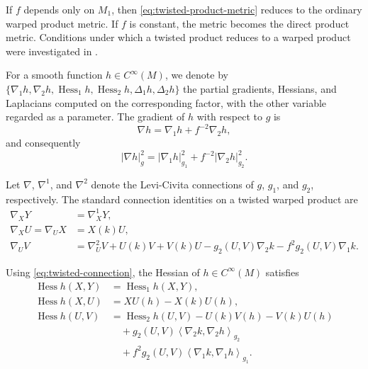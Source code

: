 \documentclass[a4paper,11pt]{article}
\theoremstyle{plain}
\numberwithin{equation}{section}
\begin{document}
If \(f\) depends only on \(M_{1}\), then
\eqref{eq:twisted-product-metric} reduces to the ordinary warped
product metric. If \(f\) is constant, the metric becomes the direct
product metric. Conditions under which a twisted product reduces
to a warped product were investigated in
\cite{FernandezLopezEtAl2001}.

For a smooth function \(h\in C^{\infty}(M)\), we denote by
$\{\nabla_{1}h,\nabla_{2}h,\operatorname{Hess}_{1}h, \operatorname{Hess}_{2}h, \Delta_{1}h,\Delta_{2}h\}$
the partial gradients, Hessians, and Laplacians computed on the
corresponding factor, with the other variable regarded as a
parameter. The gradient of \(h\) with respect to \(g\) is
\begin{equation}
	\nabla h
	=
	\nabla_{1}h
	+
	f^{-2}\nabla_{2}h,
	\label{eq:twisted-gradient}
\end{equation}
and consequently
\begin{equation}
	\lvert\nabla h\rvert_{g}^{2}
	=
	\lvert\nabla_{1}h\rvert_{g_{1}}^{2}
	+
	f^{-2}\lvert\nabla_{2}h\rvert_{g_{2}}^{2}.
	\label{eq:twisted-gradient-norm}
\end{equation}

Let \(\nabla\), \(\nabla^{1}\), and \(\nabla^{2}\) denote the
Levi-Civita connections of \(g\), \(g_{1}\), and \(g_{2}\),
respectively. The standard connection identities on a twisted
warped product are
\begin{subequations}
	\label{eq:twisted-connection}
	\begin{align}
		\nabla_{X}Y
		&=
		\nabla^{1}_{X}Y,
		\label{eq:twisted-connection-horizontal}
		\\
		\nabla_{X}U
		=
		\nabla_{U}X
		&=
		X(k)U,
		\label{eq:twisted-connection-mixed}
		\\
		\nabla_{U}V
		&=
		\nabla^{2}_{U}V
		+
		U(k)V
		+
		V(k)U
		-
		g_{2}(U,V)\nabla_{2}k
		-
		f^{2}g_{2}(U,V)\nabla_{1}k.
		\label{eq:twisted-connection-vertical}
	\end{align}
\end{subequations}

Using \eqref{eq:twisted-connection}, the Hessian of
\(h\in C^{\infty}(M)\) satisfies
\begin{subequations}
	\label{eq:twisted-hessian}
	\begin{align}
		\operatorname{Hess}h(X,Y)
		&=
		\operatorname{Hess}_{1}h(X,Y),
		\label{eq:twisted-hessian-horizontal}
		\\
		\operatorname{Hess}h(X,U)
		&=
		XU(h)-X(k)U(h),
		\label{eq:twisted-hessian-mixed}
		\\
		\operatorname{Hess}h(U,V)
		&=
		\operatorname{Hess}_{2}h(U,V)
		-
		U(k)V(h)
		-
		V(k)U(h)
		\nonumber\\
		&\quad
		+
		g_{2}(U,V)
		\left\langle\nabla_{2}k,\nabla_{2}h\right\rangle_{g_{2}}
		\nonumber\\
		&\quad
		+
		f^{2}g_{2}(U,V)
		\left\langle\nabla_{1}k,\nabla_{1}h\right\rangle_{g_{1}}.
		\label{eq:twisted-hessian-vertical}
	\end{align}
\end{subequations}
\end{document}
